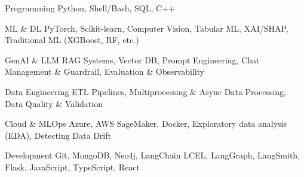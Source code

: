 

\begin{cvskills}

\vspace{0.05cm}

\cvskill
    {Programming} %
    {Python, Shell/Bash, SQL, C++} %

\vspace{0.05cm}

\cvskill
    {ML \& DL}
    {PyTorch, Scikit-learn, Computer Vision, Tabular ML, XAI/SHAP, Traditional ML (XGBoost, RF, etc.)}

\vspace{0.05cm}

\cvskill
    {GenAI \& LLM}
    {RAG Systems, Vector DB, Prompt Engineering, Chat Management \& Guardrail, Evaluation \& Observability}


\vspace{0.05cm}

\cvskill
    {Data Engineering}
    {ETL Pipelines, Multiprocessing \& Async Data Processing, Data Quality \& Validation}

\vspace{0.05cm}

\cvskill
    {Cloud \& MLOps}
    {Azure, AWS SageMaker, Docker, Exploratory data analysis (EDA), Detecting Data Drift}


\vspace{0.05cm}

\cvskill
    {Development}
    {Git, MongoDB, Neo4j, LangChain LCEL, LangGraph, LangSmith, Flask, JavaScript, TypeScript, React}


\end{cvskills}
